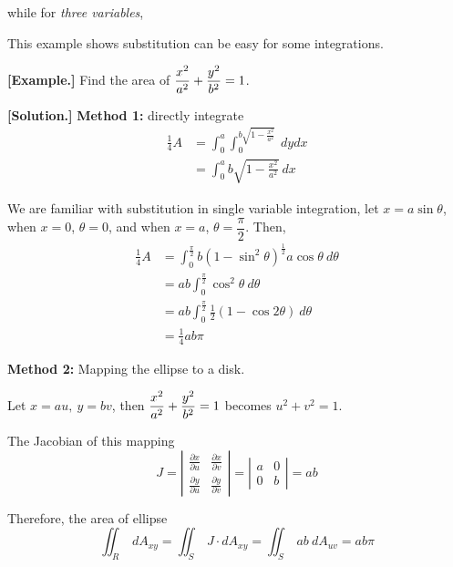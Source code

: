 \documentclass[11pt, a4paper]{MATH2023}
\newcommand{\eg}{\textbf{[Example.] }}
\newcommand{\sol}{\textbf{[Solution.] }}
\begin{document}
\begin{spacing}{1.3}
    while for {\it three variables}, 
    \begin{center}
    \end{center}

    \newpage
    {\blue This example shows substitution can be easy for some integrations.}

    \eg Find the area of $\displaystyle \frac{x^2}{a^2}+\frac{y^2}{b^2}=1$.

    \sol {\bf Method 1:} directly integrate 
    \begin{align*}
        \frac{1}{4}A &= \int_{0}^{a} \int_{0}^{b\sqrt{1-\frac{x^2}{a^2}}}\ dydx\\
         &= \int_0^a b\sqrt{1-\frac{x^2}{a^2}}\ dx
    \end{align*}

    We are familiar with substitution in single variable integration, let $x=a\sin\theta$,
    when $x=0$, $\theta=0$, and when $x=a$, $\theta=\dfrac{\pi}{2}$. Then,
    \begin{align*}
        \frac{1}{4}A &= \int_0^{\frac{\pi}{2}} b(1-\sin^2\theta)^{\frac{1}{2}} a\cos\theta\ d\theta \\ 
        &= ab\int_0^{\frac{\pi}{2}} \cos^2\theta\ d\theta\\
        &= ab\int_0^{\frac{\pi}{2}} \frac{1}{2}(1-\cos2\theta)\ d\theta\\
        &= \frac{1}{4}ab\pi
    \end{align*}

    {\bf Method 2:} Mapping the ellipse to a disk.

    Let $x=au,\ y=bv$, then $\displaystyle \frac{x^2}{a^2}+\frac{y^2}{b^2}=1$ becomes $u^2+v^2=1$.

    The Jacobian of this mapping 
    $$J=\left|\begin{array}{ll}\frac{\partial x}{\partial u} & \frac{\partial x}{\partial v} \\ \frac{\partial y}{\partial u} & \frac{\partial y}{\partial v}\end{array}\right|
    =\left| \begin{array}{cc}
        a & 0 \\ 0 & b
    \end{array} \right|=ab$$

    Therefore, the area of ellipse 
    $$\iint_R\ dA_{xy}=\iint_S\ J\cdot dA_{xy}=\iint_S\ ab\ dA_{uv}=ab\pi$$


\end{spacing}
\end{document}
